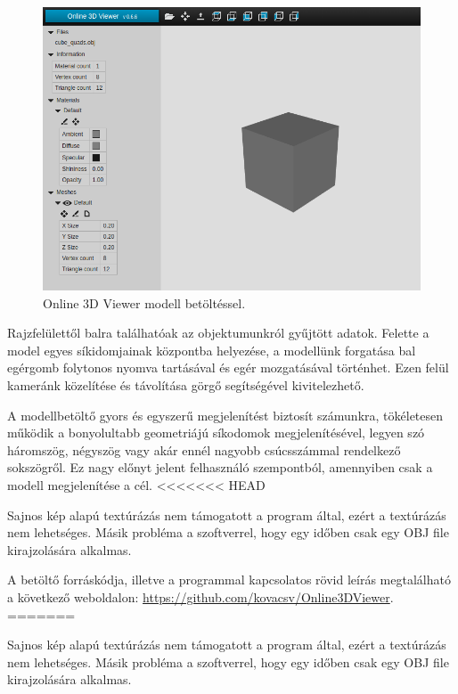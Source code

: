 \begin{figure}[h]
\centering
\includegraphics[width=\textwidth]{images/Model_Viewer_2.png}
\caption{Online 3D Viewer modell betöltéssel.}
\label{fig:model_viewer2}
\end{figure}

Rajzfelülettől balra találhatóak az objektumunkról gyűjtött adatok. Felette a model egyes síkidomjainak központba helyezése, a modellünk forgatása bal egérgomb folytonos nyomva tartásával és egér mozgatásával történhet. Ezen felül kameránk közelítése és távolítása görgő segítségével kivitelezhető.

A modellbetöltő gyors és egyszerű megjelenítést biztosít számunkra, tökéletesen működik a bonyolultabb geometriájú síkodomok megjelenítésével, legyen szó háromszög, négyszög vagy akár ennél nagyobb csúcsszámmal rendelkező sokszögről. Ez nagy előnyt jelent felhasználó szempontból, amennyiben csak a modell megjelenítése a cél.
<<<<<<< HEAD

Sajnos kép alapú textúrázás nem támogatott a program által, ezért a textúrázás nem lehetséges. Másik probléma a szoftverrel, hogy egy időben csak egy OBJ file kirajzolására alkalmas.

A betöltő forráskódja, illetve a programmal kapcsolatos rövid leírás megtalálható a következő weboldalon: \url{https://github.com/kovacsv/Online3DViewer}.
\newpage
=======

Sajnos kép alapú textúrázás nem támogatott a program által, ezért a textúrázás nem lehetséges. Másik probléma a szoftverrel, hogy egy időben csak egy OBJ file kirajzolására alkalmas.

